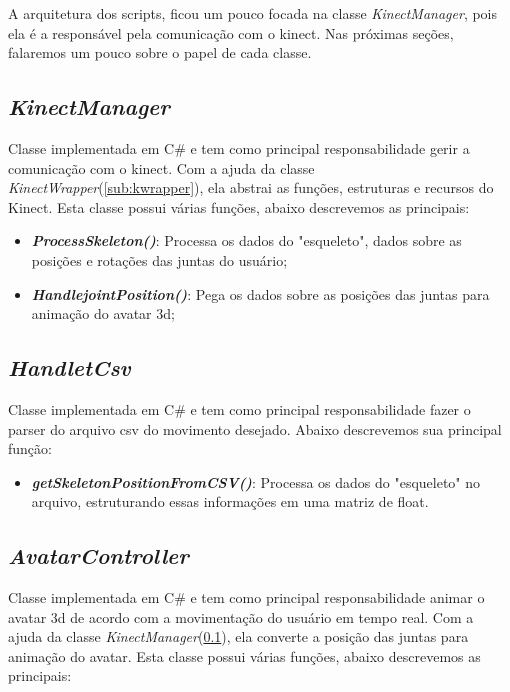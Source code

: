  A arquitetura dos scripts, ficou um pouco focada na classe \textit{KinectManager}, pois ela é a responsável pela comunicação com o kinect.
Nas próximas seções, falaremos um pouco sobre o papel de cada classe.

\subsection{\textit{KinectManager}}\label{sub:kmanager}
  Classe implementada em C\# e tem como principal responsabilidade gerir a comunicação com o kinect. Com a ajuda da classe \textit{KinectWrapper}(\ref{sub:kwrapper}), ela
  abstrai as funções, estruturas e recursos do Kinect. Esta classe possui várias funções, abaixo descrevemos as principais:

  \begin{itemize}
      \item \textit{\textbf{ProcessSkeleton()}}: Processa os dados do "esqueleto", dados sobre as posições e rotações das juntas do usuário;
      \item \textit{\textbf{HandlejointPosition()}}: Pega os dados sobre as posições das juntas para animação do avatar 3d;

  \end{itemize}

\subsection{\textit{HandletCsv}}\label{sub:getcsv}
  Classe implementada em C\# e tem como principal responsabilidade fazer o parser do arquivo csv do movimento desejado. Abaixo descrevemos sua principal função:

  \begin{itemize}
      \item \textit{\textbf{getSkeletonPositionFromCSV()}}: Processa os dados do "esqueleto" no arquivo, estruturando essas informações em uma matriz de float.
  \end{itemize}

\subsection{\textit{AvatarController}}\label{sub:avatarc}
  Classe implementada em C\# e tem como principal responsabilidade animar o avatar 3d de acordo com a movimentação do usuário em tempo real. Com a ajuda da classe \textit{KinectManager}(\ref{sub:kmanager}), ela
  converte a posição das juntas para animação do avatar. Esta classe possui várias funções, abaixo descrevemos as principais:

